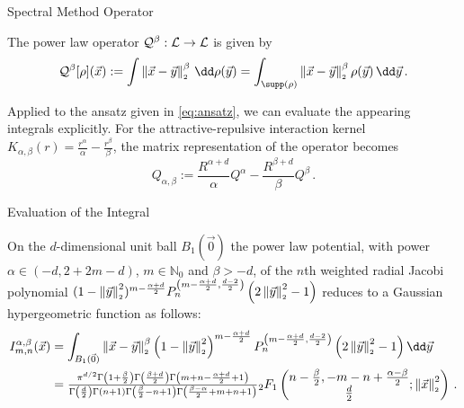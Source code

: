 \documentclass[aspectratio=169, hyperref={colorlinks=true}]{beamer}
\begin{document}
  \begin{frame}{Spectral Method Operator}
    \begin{definition}
      The power law operator $\mathcal{Q}^\beta: \mathcal{L} \to \mathcal{L}$ is given by
      $$\mathcal{Q}^\beta[\rho](\vec{x}) := \int \norm{\vec{x}-\vec{y}}^\beta \,\dd\rho(\vec{y}) = \int_{\supp(\rho)} \norm{\vec{x}-\vec{y}}^\beta \rho(\vec{y}) \,\dd\vec{y}\,.$$
    \end{definition}

    Applied to the ansatz given in \eqref{eq:ansatz}, we can evaluate the appearing integrals \alert{explicitly}.
    For the attractive-repulsive interaction kernel $K_{\alpha,\beta}(r) = \frac{r^\alpha}{\alpha} - \frac{r^\beta}{\beta}$, the matrix representation of the operator becomes
    \begin{equation}
      Q_{\alpha, \beta} := \frac{R^{\alpha+d}}{\alpha} Q^\alpha - \frac{R^{\beta+d}}{\beta} Q^\beta\,.
      \label{eq:full-attrep-operator}
    \end{equation}
  \end{frame}

  \begin{frame}{Evaluation of the Integral}
    \begin{theorem}
      On the $d$-dimensional unit ball $B_1(\vec{0})$ the power law potential, with power $\alpha \in(-d,2+2m-d)$, $m\in\mathbb{N}_0$ and $\beta>-d$, of the $n$th weighted radial Jacobi polynomial $(1-\left\lVert\vec{y}\right\rVert_{\scriptscriptstyle 2}^2)^{m-\frac{\alpha+d}{2}}P_n^{\left(m-\frac{\alpha+d}{2},\frac{d-2}{2}\right)}\left(2 \left\lVert\vec{y}\right\rVert_{\scriptscriptstyle 2}^2 - 1\right)$ reduces to a Gaussian hypergeometric function as follows:
      \begin{align*}
        I_{m,n}^{\alpha,\beta}(\vec{x}) & = \int_{B_1(\vec{0})} \norm{\vec{x}-\vec{y}}^\beta \left(1-\norm{\vec{y}}^2\right)^{m-\frac{\alpha+d}{2}} P_{n}^{\left(m-\frac{\alpha+d}{2},\frac{d-2}{2}\right)}\left(\jacobiarg{y}\right) \dd\vec{y}                                                                                                                                                                                                             \\
                                        & = \tfrac{\pi ^{d/2} \Gamma \left(1+\frac{\beta}{2}\right) \Gamma \left(\frac{\beta+d}{2}\right) \Gamma \left(m+n-\frac{\alpha+d}{2}+1\right)}{\Gamma \left(\frac{d}{2}\right) \Gamma (n+1) \Gamma \left(\frac{\beta}{2}-n+1\right) \Gamma \left(\frac{\beta-\alpha}{2}+m+n+1\right)}{}_2F_1\left(\begin{matrix}n-\frac{\beta}{2}, -m-n+\frac{\alpha-\beta}{2} \\\frac{d}{2}\end{matrix};\norm{\vec{x}}^2\right)\,.
      \end{align*}
    \end{theorem}
  \end{frame}
\end{document}
